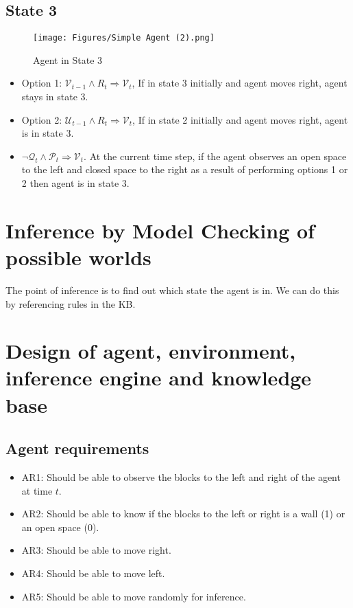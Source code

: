 \documentclass{article}
\begin{document}
\subsection{State 3}


\begin{figure}[H]
    \centering
    \texttt{[image: Figures/Simple Agent (2).png]}
    \caption{Agent in State 3}
    \label{fig:S3}
\end{figure}

\begin{itemize}
    \item Option 1: $ \mathcal{V}_{t-1} \wedge R_t \Rightarrow \mathcal{V}_t $, If in state 3 initially and agent moves right, agent stays in state 3.
    \item Option 2: $ \mathcal{U}_{t-1} \wedge R_t \Rightarrow \mathcal{V}_t $, If in state 2 initially and agent moves right, agent is in state 3.
    \item $\neg \mathcal{Q}_t \wedge \mathcal{P}_t \Rightarrow \mathcal{V}_t$. At the current time step, if the agent observes an open space to the left and closed space to the right as a result of performing options 1 or 2 then agent is in state 3.   
\end{itemize}

\section{Inference by Model Checking of possible worlds}

The point of inference is to find out which state the agent is in. We can do this by referencing rules in the KB. 










\section{Design of agent, environment, inference engine and knowledge base}

\subsection{Agent requirements}

\begin{itemize}
    \item AR1: Should be able to observe the blocks to the left and right of the agent at time $t$.
    \item AR2: Should be able to know if the blocks to the left or right is a wall (1) or an open space (0).
    \item AR3: Should be able to move right.
    \item AR4: Should be able to move left.
    \item AR5: Should be able to move randomly for inference.
\end{itemize}
\end{document}
